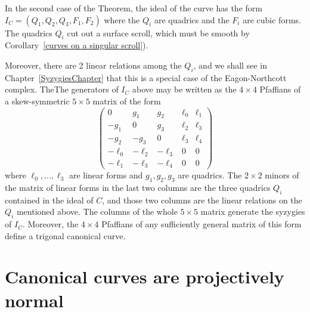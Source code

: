 \begin{fact}
In the second case of the Theorem, the ideal of the curve has the form $I_C = (Q_1, Q_2, Q_3, F_1, F_2)$ 
where the $Q_i$ are quadrics and the $F_i$ are cubic forms. The quadrics $Q_i$ cut out a surface scroll, which
must be smooth by Corollary~\ref{curves on a singular scroll}).

Moreover, there are 2 linear relations among the
$Q_i$, and we shall see in Chapter~\ref{SyzygiesChapter} that this is a special case of the Eagon-Northcott
complex. TheThe generators of $I_C$ above may be written as the $4\times 4$ Pfaffians
of a skew-symmetric $5\times 5$ matrix of the form
$$
\begin{pmatrix}
0&g_1&g_2&\ell_0&\ell_1\\
-g_1&0&g_3&\ell_2&\ell_3\\
-g_2&-g_3&0 &\ell_3&\ell_4\\
-\ell_0&-\ell_2&-\ell_3&0&0\\
-\ell_1&-\ell_3&-\ell_4&0&0
\end{pmatrix}
$$
where $\ell_0,\dots,\ell_3$ are linear forms and $g_1, g_2, g_3$ are quadrics. The
 $2\times 2$
minors of the matrix of linear forms in the last two columns are the three quadrics $Q_i$ contained in the ideal
of $C$, and those two columns are the linear relations on the $Q_i$ mentioned above.
The columns of the whole $5\times 5$ matrix generate the syzygies of $I_C$. Moreover, the
$4\times 4$ Pfaffians of any sufficiently general matrix of this form define a trigonal canonical curve.
\end{fact}


\section{Canonical curves are projectively normal}\label{Noether theorem section}

